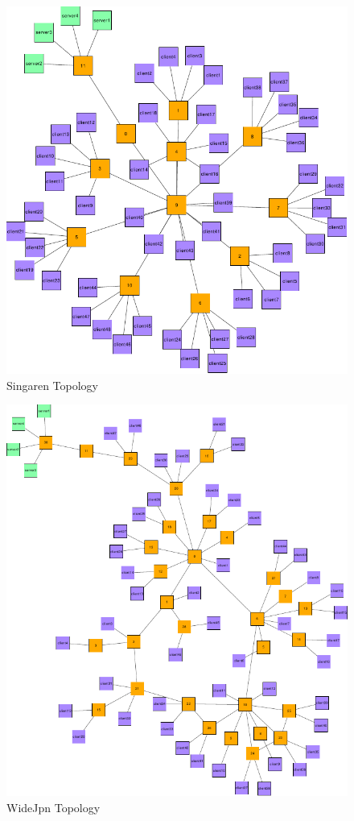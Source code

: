 \begin{figure}[htbp]
    \centering
    \includegraphics[width=\linewidth]{Networks/Singaren_final.pdf}
    \caption{Singaren Topology}
    \label{fig:Singaren}
\end{figure}

\begin{figure}[htbp]
    \centering
    \includegraphics[width=\linewidth]{Networks/WideJpn_final.pdf}
    \caption{WideJpn Topology}
    \label{fig:WideJpn}
\end{figure}